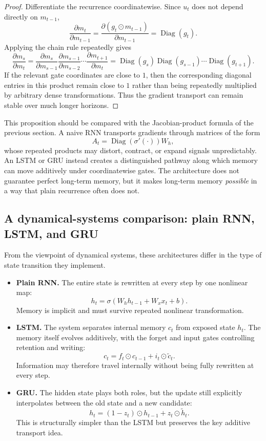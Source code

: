 \begin{proof}
Differentiate the recurrence coordinatewise.
Since $u_t$ does not depend directly on $m_{t-1}$,
\[
 \frac{\partial m_t}{\partial m_{t-1}}
 = \frac{\partial (g_t \odot m_{t-1})}{\partial m_{t-1}}
 = \operatorname{Diag}(g_t).
\]
Applying the chain rule repeatedly gives
\[
 \frac{\partial m_s}{\partial m_t}
= \frac{\partial m_s}{\partial m_{s-1}}
  \frac{\partial m_{s-1}}{\partial m_{s-2}}
  \cdots
  \frac{\partial m_{t+1}}{\partial m_t}
= \operatorname{Diag}(g_s)\operatorname{Diag}(g_{s-1})\cdots \operatorname{Diag}(g_{t+1}).
\]
If the relevant gate coordinates are close to $1$, then the corresponding diagonal entries in this product remain close to $1$ rather than being repeatedly multiplied by arbitrary dense transformations.
Thus the gradient transport can remain stable over much longer horizons.
\end{proof}

\medskip

This proposition should be compared with the Jacobian-product formula of the previous section.
A naive RNN transports gradients through matrices of the form
\[
A_t = \operatorname{Diag}(\sigma'(\cdot)) W_h,
\]
whose repeated products may distort, contract, or expand signals unpredictably.
An LSTM or GRU instead creates a distinguished pathway along which memory can move additively under coordinatewise gates.
The architecture does not guarantee perfect long-term memory, but it makes long-term memory \emph{possible} in a way that plain recurrence often does not.

\subsection*{A dynamical-systems comparison: plain RNN, LSTM, and GRU}

From the viewpoint of dynamical systems, these architectures differ in the type of state transition they implement.

\begin{itemize}
    \item \textbf{Plain RNN.}
    The entire state is rewritten at every step by one nonlinear map:
    \[
    h_t = \sigma(W_h h_{t-1} + W_x x_t + b).
    \]
    Memory is implicit and must survive repeated nonlinear transformation.

    \item \textbf{LSTM.}
    The system separates internal memory $c_t$ from exposed state $h_t$.
    The memory itself evolves additively, with the forget and input gates controlling retention and writing:
    \[
    c_t = f_t \odot c_{t-1} + i_t \odot \widetilde{c}_t.
    \]
    Information may therefore travel internally without being fully rewritten at every step.

    \item \textbf{GRU.}
    The hidden state plays both roles, but the update still explicitly interpolates between the old state and a new candidate:
    \[
    h_t = (1-z_t) \odot h_{t-1} + z_t \odot \widetilde{h}_t.
    \]
    This is structurally simpler than the LSTM but preserves the key additive transport idea.
\end{itemize}

